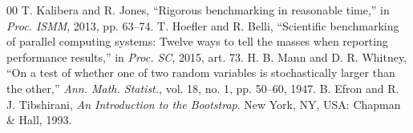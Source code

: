 \documentclass[conference]{IEEEtran}
\begin{document}
\begin{thebibliography}{00}
 T. Kalibera and R. Jones, ``Rigorous benchmarking in reasonable time,'' in \textit{Proc. ISMM}, 2013, pp. 63--74.
 T. Hoefler and R. Belli, ``Scientific benchmarking of parallel computing systems: Twelve ways to tell the masses when reporting performance results,'' in \textit{Proc. SC}, 2015, art. 73.
 H. B. Mann and D. R. Whitney, ``On a test of whether one of two random variables is stochastically larger than the other,'' \textit{Ann. Math. Statist.}, vol. 18, no. 1, pp. 50--60, 1947.
 B. Efron and R. J. Tibshirani, \textit{An Introduction to the Bootstrap}. New York, NY, USA: Chapman \& Hall, 1993.
\end{thebibliography}
\end{document}
